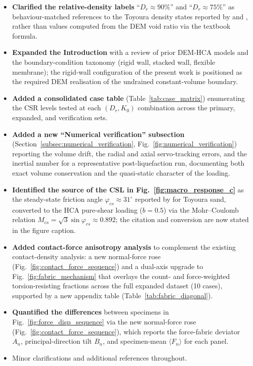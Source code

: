 \documentclass[11pt,a4paper]{article}
\newcommand{\Kzero}{\ensuremath{K_0}}
\begin{document}
\begin{itemize}[leftmargin=*]
  \item \textbf{Clarified the relative-density labels}
    ``$D_r \approx 90\%$'' and ``$D_r \approx 75\%$'' as
    behaviour-matched references to the Toyoura density states
    reported by \citet{Nakata1998} and \citet{Ishihara1985}, rather
    than values computed from the DEM void ratio via the textbook
    formula.
  \item \textbf{Expanded the Introduction} with a review of prior
    DEM-HCA models and the boundary-condition taxonomy (rigid wall,
    stacked wall, flexible membrane); the rigid-wall configuration of
    the present work is positioned as the required DEM realisation of
    the undrained constant-volume boundary.
  \item \textbf{Added a consolidated case table}
    (Table~\ref{tab:case_matrix}) enumerating the CSR levels tested
    at each $(D_r, \Kzero)$ combination across the primary, expanded,
    and verification sets.
  \item \textbf{Added a new ``Numerical verification'' subsection}
    (Section~\ref{subsec:numerical_verification},
    Fig.~\ref{fig:numerical_verification}) reporting the volume
    drift, the radial and axial servo-tracking errors, and the
    inertial number for a representative post-liquefaction run,
    documenting both exact volume conservation and the quasi-static
    character of the loading.
  \item \textbf{Identified the source of the CSL in
    Fig.~\ref{fig:macro_response_c}} as the steady-state friction
    angle $\varphi_{cs}\approx 31^{\circ}$ reported by
    \citet{VerdugoIshihara1996} for Toyoura sand, converted to the
    HCA pure-shear loading ($b=0.5$) via the Mohr--Coulomb relation
    $M_{cs}=\sqrt{3}\sin\varphi_{cs}\approx 0.892$; the citation and
    conversion are now stated in the figure caption.
  \item \textbf{Added contact-force anisotropy analysis} to complement
    the existing contact-density analysis: a new normal-force rose
    (Fig.~\ref{fig:contact_force_sequence}) and a dual-axis upgrade
    to Fig.~\ref{fig:fabric_mechanism} that overlays the count- and
    force-weighted torsion-resisting fractions across the full
    expanded dataset (10 cases), supported by a new appendix table
    (Table~\ref{tab:fabric_diagonal}).
  \item \textbf{Quantified the differences} between specimens in
    Fig.~\ref{fig:force_disp_sequence} via the new normal-force rose
    (Fig.~\ref{fig:contact_force_sequence}), which reports the
    force-fabric deviator $A_n$, principal-direction tilt $B_n$, and
    specimen-mean $\langle F_n\rangle$ for each panel.
  \item Minor clarifications and additional references throughout.
\end{itemize}
\end{document}
